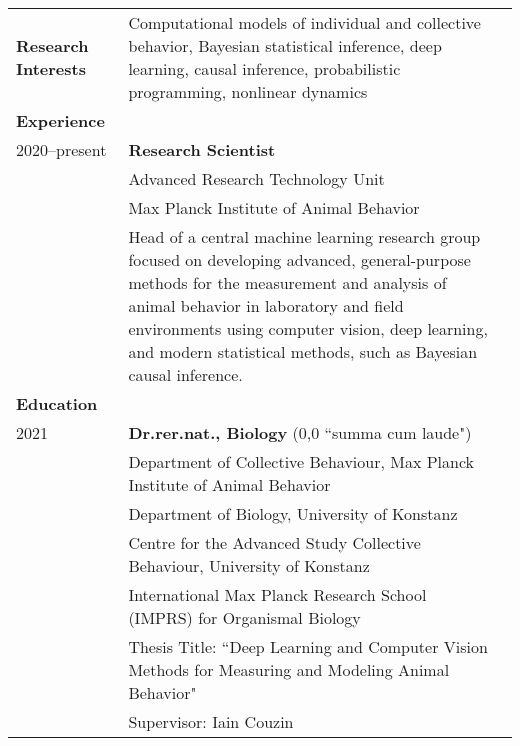 \documentclass[letterpaper,10pt,oneside]{article}
\newcommand{\tabitem}{\hspace{2mm}\textbullet\hspace{2mm}}
\begin{document}
\begin{small}
\noindent \begin{longtable}{@{} l p{5in}l}

\large{\textbf{Research Interests}}
& Computational models of individual and collective behavior, Bayesian statistical inference, deep learning, causal inference, probabilistic programming, nonlinear dynamics \vspace{2mm}\\ 

\Large{\textbf{Experience}} \vspace{2mm} \\
\large{2020--present} 
& \textbf{Research Scientist} \\
& {Advanced Research Technology Unit} \\
& {Max Planck Institute of Animal Behavior} \\
& \tabitem Head of a central machine learning research group focused on developing advanced, general-purpose methods for the measurement and analysis of animal behavior in laboratory and field environments using computer vision, deep learning, and modern statistical methods, such as Bayesian causal inference.\vspace{5mm} \\

\Large{\textbf{Education}} \vspace{2mm} \\
 \large{2021} 
 & \textbf{Dr.rer.nat., Biology} (0,0 ``summa cum laude")\\
  &   {Department of Collective Behaviour, Max Planck Institute of Animal Behavior} \\
 &   {Department of Biology, University of Konstanz} \\
 &  {Centre for the Advanced Study Collective Behaviour, University of Konstanz} \\
 &   {International Max Planck Research School (IMPRS) for Organismal Biology} \\
 &  \tabitem Thesis Title: ``Deep Learning and Computer Vision Methods for Measuring and Modeling Animal Behavior" \\
 & \tabitem Supervisor: Iain Couzin \vspace{2mm}  \\


\end{longtable}
\end{small}
\end{document}
